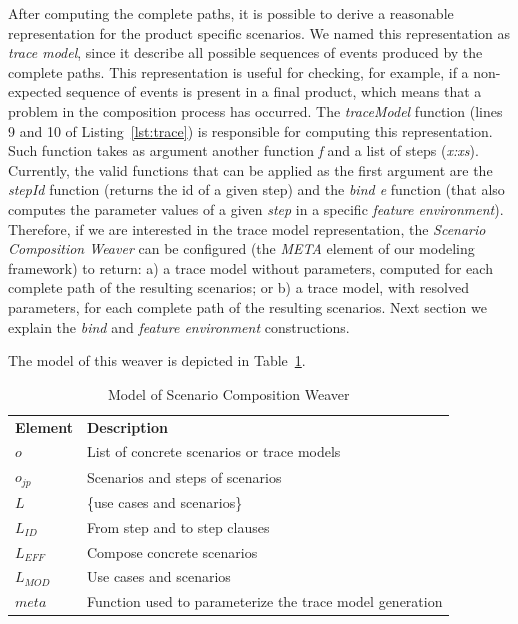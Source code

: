 \documentclass{acm_proc_article-sp}
\begin{document}
After computing the complete paths, it is possible to derive a reasonable representation 
for the product specific scenarios. We named this representation as \emph{trace model}, since 
it describe all possible sequences of events produced by the complete paths. This representation is 
useful for checking, for example, if a non-expected sequence of events is present in a final product, which 
means that a problem in the composition process has occurred. The \emph{traceModel} 
function (lines 9 and 10 of Listing~\ref{lst:trace}) is responsible for computing this representation. 
Such function takes as argument another function \emph{f} and a list of steps (\emph{x:xs}).
Currently, the valid functions that can be applied as the first argument are the \emph{stepId} function (returns the id
of a given step) and the \emph{bind e} function (that also computes the
parameter values of a given \emph{step} in a specific \emph{feature
environment}). Therefore, if we are interested in the trace model representation, the \emph{Scenario 
Composition Weaver} can be configured (the \emph{META} element of
our modeling framework) to return:  a) a trace model without parameters, computed
for each complete path of the resulting scenarios; or b) a trace model,
with resolved parameters, for each complete path of the resulting scenarios.  Next section we explain 
the \emph{bind} and \emph{feature environment} constructions. 

The model of this weaver is depicted in Table~\ref{tab:sc-weaver}. 

\begin{table}[bh]
\begin{center}
\caption{Model of Scenario Composition Weaver} \label{tab:sc-weaver}
\begin{tabular}{p{0.6in}p{2.4in}}
   \hline\noalign{\smallskip}
  {\bf Element} & {\bf Description} \\
   \noalign{\smallskip}
   \hline
   \noalign{\smallskip}
   $o$               & List of concrete scenarios or trace models  \\ 
   $o_{jp}$        & Scenarios and steps of scenarios \\ 
   $L$               & \{use cases and scenarios\} \\ 
   $L_{ID}$       & From step and to step clauses \\ 
   $L_{EFF}$    & Compose concrete scenarios  \\ 
   $L_{MOD}$ & Use cases and scenarios \\  
   $meta$          & Function used to parameterize the trace model generation \\ 
  \hline
  \end{tabular}
\end{center}
\end{table}
\end{document}
